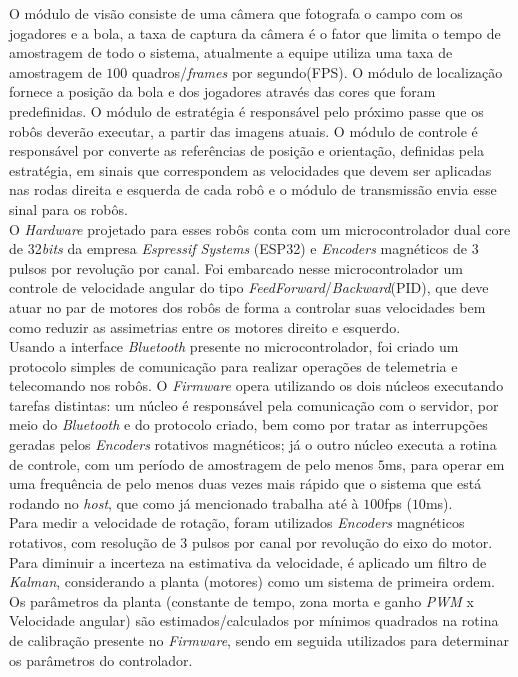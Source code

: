 O módulo de visão consiste de uma câmera que fotografa o campo com os jogadores e a bola, a taxa de captura da câmera é o fator que limita o tempo de amostragem de todo o sistema, atualmente a equipe utiliza uma taxa de amostragem de $100$ quadros/\emph{frames} por segundo(FPS). O módulo de localização fornece a posição da bola e dos jogadores através das cores que foram predefinidas. O módulo de estratégia é responsável pelo próximo passe que os robôs deverão executar, a partir das imagens atuais. O módulo de controle é responsável por converte as referências de posição e orientação, definidas pela estratégia, em sinais que correspondem as velocidades que devem ser aplicadas nas rodas direita e esquerda de cada robô e o módulo de transmissão envia esse sinal para os robôs.\\

O \textit{Hardware} projetado para esses robôs conta com um microcontrolador dual core de 32\emph{bits} da empresa \emph{Espressif Systems} (ESP32) e \textit{Encoders} magnéticos de $3$ pulsos por revolução por canal. Foi embarcado  nesse microcontrolador um controle de velocidade angular do tipo  \textit{FeedForward}/\textit{Backward}(PID), que deve atuar no par de motores dos robôs de  forma a controlar suas velocidades bem como reduzir as assimetrias entre  os motores direito e esquerdo.\\

Usando a interface \textit{Bluetooth} presente no microcontrolador, foi criado um  protocolo simples de comunicação para realizar operações de telemetria e telecomando nos robôs. O \textit{Firmware} opera utilizando os dois núcleos  executando tarefas distintas: um núcleo é responsável pela comunicação  com o servidor, por meio do \textit{Bluetooth} e do protocolo criado, bem como  por tratar as interrupções geradas pelos \textit{Encoders} rotativos magnéticos;  já o outro núcleo executa a rotina de controle, com um período de amostragem de pelo menos $5$ms, para operar em uma frequência de pelo menos duas vezes mais rápido que o sistema que está rodando no \emph{host}, que como já mencionado trabalha até à $100$fps ($10$ms).\\

Para medir a velocidade de rotação, foram utilizados \textit{Encoders} magnéticos  rotativos, com resolução de $3$ pulsos por canal por revolução do eixo do motor. Para diminuir a  incerteza na estimativa da velocidade, é aplicado um filtro de \textit{Kalman},  considerando a planta (motores) como um sistema de primeira ordem. Os  parâmetros da planta (constante de tempo, zona morta e ganho \emph{PWM} x  Velocidade angular) são estimados/calculados por mínimos quadrados na  rotina de calibração presente no \textit{Firmware}, sendo em seguida utilizados  para determinar os parâmetros do controlador.

